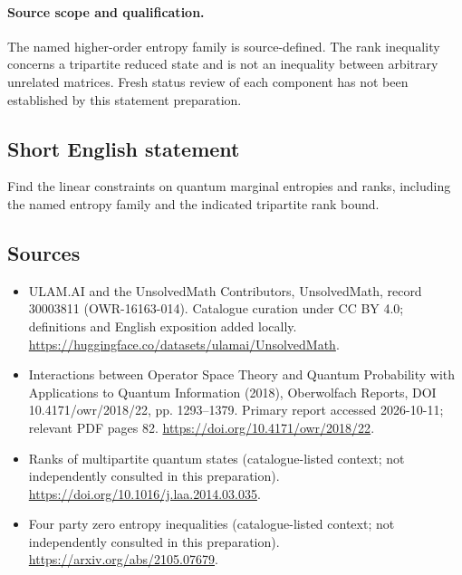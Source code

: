 \documentclass[11pt]{article}
\begin{document}
\paragraph{Source scope and qualification.}
The named higher-order entropy family is source-defined. The rank inequality concerns a tripartite reduced state and is not an inequality between arbitrary unrelated matrices. Fresh status review of each component has not been established by this statement preparation.
\subsection{Short English statement}
Find the linear constraints on quantum marginal entropies and ranks, including the named entropy family and the indicated tripartite rank bound.
\subsection{Sources}
\begin{itemize}
\item[\hypertarget{source:30003811:1}{S1}] ULAM.AI and the UnsolvedMath Contributors, UnsolvedMath, record 30003811 (OWR-16163-014). Catalogue curation under CC BY 4.0; definitions and English exposition added locally.
\url{https://huggingface.co/datasets/ulamai/UnsolvedMath}.
\item[\hypertarget{source:30003811:2}{S2}] Interactions between Operator Space Theory and Quantum Probability with Applications to Quantum Information (2018), Oberwolfach Reports, DOI 10.4171/owr/2018/22, pp. 1293--1379. Primary report accessed 2026-10-11; relevant PDF pages 82.
\url{https://doi.org/10.4171/owr/2018/22}.
\item[\hypertarget{source:30003811:3}{S3}] Ranks of multipartite quantum states (catalogue-listed context; not independently consulted in this preparation).
\url{https://doi.org/10.1016/j.laa.2014.03.035}.
\item[\hypertarget{source:30003811:4}{S4}] Four party zero entropy inequalities (catalogue-listed context; not independently consulted in this preparation).
\url{https://arxiv.org/abs/2105.07679}.
\end{itemize}
\label{end:30003811}
\end{document}
